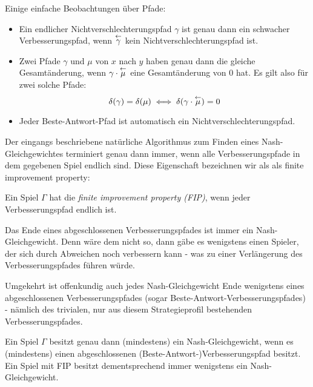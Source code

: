 \begin{beob}\label{beob:Pfade}
	Einige einfache Beobachtungen über Pfade:
	\begin{itemize}
		\item Ein endlicher Nichtverschlechterungspfad $\gamma$ ist genau dann ein schwacher Verbesserungspfad, wenn $\overset{\leftarrow}{\gamma}$ kein Nichtverschlechterungspfad ist. 
		
		\item Zwei Pfade $\gamma$ und $\mu$ von $x$ nach $y$ haben genau dann die gleiche Gesamtänderung, wenn $\gamma\cdot\overset{\leftarrow}{\mu}$ eine Gesamtänderung von $0$ hat. Es gilt also für zwei solche Pfade: 
		\[\delta(\gamma) = \delta(\mu) \iff \delta(\gamma\cdot\overset{\leftarrow}{\mu})=0 \]
		
		\item Jeder Beste-Antwort-Pfad ist automatisch ein Nichtverschlechterungspfad.
	\end{itemize}
\end{beob}

Der eingangs beschriebene natürliche Algorithmus zum Finden eines Nash-Gleichgewichtes terminiert genau dann immer, wenn alle Verbesserungspfade in dem gegebenen Spiel endlich sind. Diese Eigenschaft bezeichnen wir als als finite improvement property:

\begin{defn}
	Ein Spiel $\Gamma$ hat die \emph{finite improvement property (FIP)}, wenn jeder Verbesserungspfad endlich ist.
\end{defn}

\begin{beob}\label{beob:VerbPfadeundNGe}
	Das Ende eines abgeschlossenen Verbesserungspfades ist immer ein Nash-Gleichgewicht. Denn wäre dem nicht so, dann gäbe es wenigstens einen Spieler, der sich durch Abweichen noch verbessern kann - was zu einer Verlängerung des Verbesserungspfades führen würde. 
		
	Umgekehrt ist offenkundig auch jedes Nash-Gleichgewicht Ende wenigstens eines abgeschlossenen Verbesserungspfades (sogar Beste-Antwort-Verbesserungspfades) - nämlich des trivialen, nur aus diesem Strategieprofil bestehenden Verbesserungspfades.
\end{beob}

\begin{beob}\label{kor:ExVerbPfadExNG}
	Ein Spiel $\Gamma$ besitzt genau dann (mindestens) ein Nash-Gleichgewicht, wenn es (mindestens) einen abgeschlossenen (Beste-Antwort-)Verbesserungspfad besitzt. Ein Spiel mit FIP besitzt dementsprechend immer wenigstens ein Nash-Gleichgewicht.
\end{beob}

